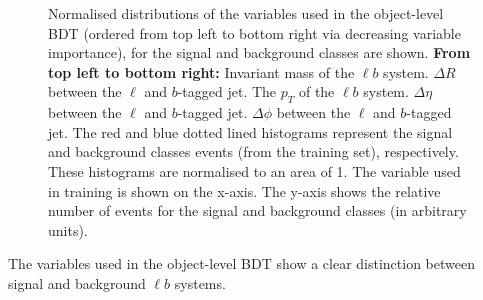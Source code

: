 \begin{figure}[h!]
  
    \caption{Normalised distributions of the variables used in the object-level BDT (ordered from top left to bottom right via decreasing variable importance), for the signal and background classes are shown. \textbf{From top left to bottom right:} Invariant mass of the $\ell b$ system. $\Delta R$ between the $\ell$ and $b$-tagged jet. The $p_{T}$ of the $\ell b$ system. $\Delta \eta$ between the $\ell$ and $b$-tagged jet. $\Delta \phi$ between the $\ell$ and $b$-tagged jet. The red and blue dotted lined histograms represent the signal and background classes events (from the training set), respectively. These histograms are normalised to an area of 1. The variable used in training is shown on the x-axis. The y-axis shows the relative number of events for the signal and background classes (in arbitrary units). }
    \label{fig:norm-object-bdt-vars}
\end{figure}

The variables used in the object-level BDT show a clear distinction between signal and background $\ell b$ systems. \\

